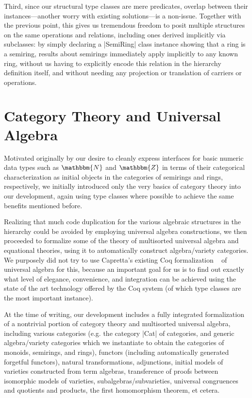 \documentclass{llncs}
\newcommand{\N}{\ensuremath{\mathbbm{N}}}
\newcommand{\Z}{\ensuremath{\mathbbm{Z}}}
\begin{document}
Third, since our structural type classes are mere predicates, overlap between their instances---another worry with existing solutions---is a non-issue. Together with the previous point, this gives us tremendous freedom to posit multiple structures on the same operations and relations, including ones derived implicitly via subclasses: by simply declaring a |SemiRing| class instance showing that a ring is a semiring, results about semirings immediately apply implicitly to any known ring, without us having to explicitly encode this relation in the hierarchy definition itself, and without needing any projection or translation of carriers or operations.

\section{Category Theory and Universal Algebra}\label{interfaces}\label{modul}

Motivated originally by our desire to cleanly express interfaces for basic numeric data types such as $\N$ and $\Z$ in terms of their categorical characterization as initial objects in the categories of semirings and rings, respectively, we initially introduced only the very basics of category theory into our development, again using type classes where possible to achieve the same benefits mentioned before.

Realizing that much code duplication for the various algebraic structures in the hierarchy could be avoided by employing universal algebra constructions, we then proceeded to formalize some of the theory of multisorted universal algebra and equational theories, using it to automatically construct algebra/variety categories. We purposely did not try to use Capretta's existing Coq formalization ~\cite{DBLP:conf/tphol/Capretta99} of universal algebra for this, because an important goal for us is to find out exactly what level of elegance, convenience, and integration can be achieved using the state of the art technology offered by the Coq system (of which type classes are the most important instance).

At the time of writing, our development includes a fully integrated formalization of a nontrivial portion of category theory and multisorted universal algebra, including various categories (e.g. the category |Cat| of categories, and generic algebra/variety categories which we instantiate to obtain the categories of monoids, semirings, and rings), functors (including automatically generated forgetful functors), natural transformations, adjunctions, initial models of varieties constructed from term algebras, transference of proofs between isomorphic models of varieties, subalgebras/subvarieties, universal congruences and quotients and products, the first homomorphism theorem, et cetera.
\end{document}

